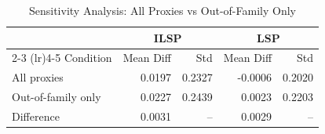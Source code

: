 \begin{table}[htbp]
\centering
\caption{Sensitivity Analysis: All Proxies vs Out-of-Family Only}
\label{tab:sensitivity}
\begin{tabular}{lrrrr}
\toprule
& \multicolumn{2}{c}{ILSP} & \multicolumn{2}{c}{LSP} \\
\cmidrule(lr){2-3} \cmidrule(lr){4-5}
Condition & Mean Diff & Std & Mean Diff & Std \\
\midrule
All proxies & 0.0197 & 0.2327 & -0.0006 & 0.2020 \\
Out-of-family only & 0.0227 & 0.2439 & 0.0023 & 0.2203 \\
\midrule
Difference & 0.0031 & -- & 0.0029 & -- \\
\bottomrule
\end{tabular}
\end{table}